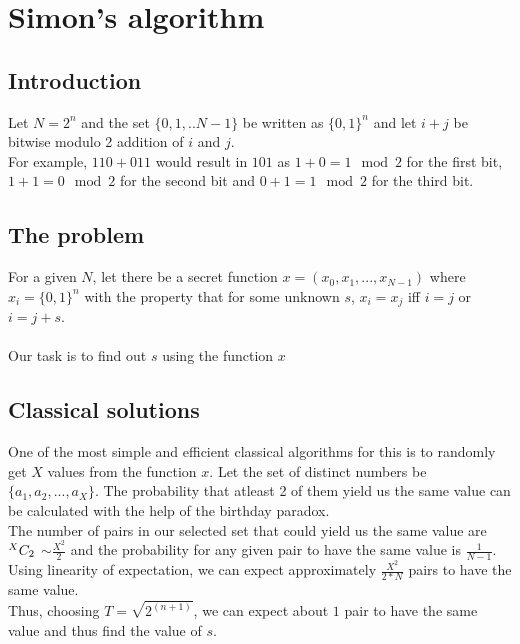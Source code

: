 \chapter{Simon's algorithm}
\section{Introduction}
Let $N = 2^n$ and the set $\{0, 1, .. N - 1\}$ be written as $\{0, 1\}^n$ and let $i + j$ be bitwise modulo 2 addition of $i$ and $j$. \\
For example, $110 + 011$ would result in $101$ as $1 + 0 = 1\mod2$ for the first bit, $1 + 1 = 0\mod2$ for the second bit and $0 + 1 = 1\mod2$ for the third bit. 
\section{The problem}
For a given $N$, let there be a secret function $x = (x_{0}, x_{1},..., x_{N - 1})$ where $x_{i} = \{0, 1\}^n$ with the property that for some unknown $s$, $x_{i} = x_{j}$ iff $i = j$ or $i = j + s$. \\ \\
Our task is to find out $s$ using the function $x$
\section{Classical solutions}
One of the most simple and efficient classical algorithms for this is to randomly get $X$ values from the function $x$. Let the set of distinct numbers be $\{a_{1}, a_{2},...,a_{X}\}$. The probability that atleast 2 of them yield us the same value can be calculated with the help of the birthday paradox. \\
The number of pairs in our selected set that could yield us the same value are ${}^{X}C_{2}$ $\sim \frac{X^2}{2}$ and the probability for any given pair to have the same value is $\frac{1}{N - 1}$. \\
Using linearity of expectation, we can expect approximately $\frac{X^2}{2 * N}$ pairs to have the same value. \\
Thus, choosing $T = \sqrt{2^\left(n + 1\right)}$, we can expect about $1$ pair to have the same value and thus find the value of $s$.
